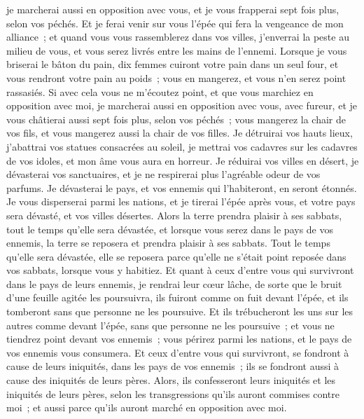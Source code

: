 \begin{multicols}{2}
je marcherai aussi en opposition avec vous, et je vous frapperai sept fois plus, selon vos péchés.
Et je ferai venir sur vous l'épée qui fera la vengeance de mon alliance~; et quand vous vous rassemblerez dans vos villes, j'enverrai la peste au milieu de vous, et vous serez livrés entre les mains de l'ennemi.
Lorsque je vous briserai le bâton du pain, dix femmes cuiront votre pain dans un seul four, et vous rendront votre pain au poids~; vous en mangerez, et vous n'en serez point rassasiés.
Si avec cela vous ne m'écoutez point, et que vous marchiez en opposition avec moi,
je marcherai aussi en opposition avec vous, avec fureur, et je vous châtierai aussi sept fois plus, selon vos péchés~;
vous mangerez la chair de vos fils, et vous mangerez aussi la chair de vos filles.
Je détruirai vos hauts lieux, j'abattrai vos statues consacrées au soleil, je mettrai vos cadavres sur les cadavres de vos idoles, et mon âme vous aura en horreur.
Je réduirai vos villes en désert, je dévasterai vos sanctuaires, et je ne respirerai plus l'agréable odeur de vos parfums.
Je dévasterai le pays, et vos ennemis qui l'habiteront, en seront étonnés.
Je vous disperserai parmi les nations, et je tirerai l'épée après vous, et votre pays sera dévasté, et vos villes désertes.
Alors la terre prendra plaisir à ses sabbats, tout le temps qu'elle sera dévastée, et lorsque vous serez dans le pays de vos ennemis, la terre se reposera et prendra plaisir à ses sabbats.
Tout le temps qu'elle sera dévastée, elle se reposera parce qu'elle ne s'était point reposée dans vos sabbats, lorsque vous y habitiez.
Et quant à ceux d'entre vous qui survivront dans le pays de leurs ennemis, je rendrai leur cœur lâche, de sorte que le bruit d'une feuille agitée les poursuivra, ils fuiront comme on fuit devant l'épée, et ils tomberont sans que personne ne les poursuive.
Et ils trébucheront les uns sur les autres comme devant l'épée, sans que personne ne les poursuive~; et vous ne tiendrez point devant vos ennemis~;
vous périrez parmi les nations, et le pays de vos ennemis vous consumera.
Et ceux d'entre vous qui survivront, se fondront à cause de leurs iniquités, dans les pays de vos ennemis~; ils se fondront aussi à cause des iniquités de leurs pères.
Alors, ils confesseront leurs iniquités et les iniquités de leurs pères, selon les transgressions qu'ils auront commises contre moi~; et aussi parce qu'ils auront marché en opposition avec moi.

\end{multicols}
